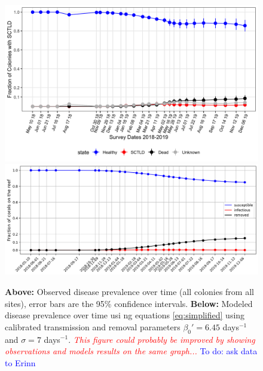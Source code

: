 \documentclass[utf8]{frontiersSCNS}
\newcommand{\emphc}[1]{\emph{\textcolor{red}{#1}}}
\begin{document}
\begin{figure}
    \centering
    \includegraphics[width=.7\textwidth]{figures/image2.png}
    \includegraphics[width=.69\textwidth]{figures/sir_obs.png}
    \caption{\textbf{Above:} Observed disease prevalence over time (all colonies from all sites), error bars are the 95\% confidence intervals. \textbf{Below:} Modeled disease prevalence over time usi ng equations \ref{eq:simplified} using calibrated transmission and removal parameters  $\beta_0'=6.45$ days$^{-1}$ and $\sigma=7$ days$^{-1}$. \emphc{This figure could probably be improved by showing observations and models results on the same graph...} \textcolor{blue}{To do: ask data to Erinn}}
    \label{fig:calibration}
\end{figure}
\end{document}
